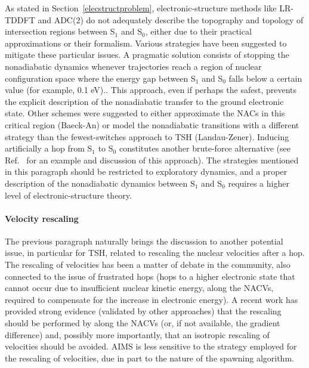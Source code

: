\documentclass[9pt,bestpractices]{livecoms}
\begin{document}
As stated in Section~\ref{elecstructproblem}, electronic-structure methods like LR-TDDFT and ADC(2) do not adequately describe the topography and topology of intersection regions between S$_1$ and S$_0$, either due to their practical approximations or their formalism. Various strategies have been suggested to mitigate these particular issues. A pragmatic solution consists of stopping the nonadiabatic dynamics whenever trajectories reach a region of nuclear configuration space where the energy gap between S$_1$ and S$_0$ falls below a certain value (for example, 0.1 eV).\cite{crespo-otero2011,plasser2014surface}. This approach, even if perhaps the safest, prevents the explicit description of the nonadiabatic transfer to the ground electronic state. Other schemes were suggested to either approximate the NACs in this critical region (Baeck-An\cite{baeck-an2017,do2022fewest}) or model the nonadiabatic transitions with a different strategy than the fewest-switches approach to TSH (Landau-Zener\cite{belyaev2011nonadiabatic,slavicek2020}). Inducing artificially a hop from S$_1$ to S$_0$ constitutes another brute-force alternative (see Ref.~ for an example and discussion of this approach). The strategies mentioned in this paragraph should be restricted to exploratory dynamics, and a proper description of the nonadiabatic dynamics between S$_1$ and S$_0$ requires a higher level of electronic-structure theory. 

\paragraph{Velocity rescaling}

The previous paragraph naturally brings the discussion to another potential issue, in particular for TSH, related to rescaling the nuclear velocities after a hop. The rescaling of velocities has been a matter of debate in the community, also connected to the issue of frustrated hops (hops to a higher electronic state that cannot occur due to insufficient nuclear kinetic energy, along the NACVs, required to compensate for the increase in electronic energy).\cite{fang99b,huang2023,subotnik2016understanding} A recent work has provided strong evidence (validated by other approaches\cite{Mannouch2023}) that the rescaling should be performed by along the NACVs (or, if not available, the gradient difference) and, possibly more importantly, that an isotropic rescaling of velocities should be avoided.\cite{toldo2024velresc} AIMS is less sensitive to the strategy employed for the rescaling of velocities, due in part to the nature of the spawning algorithm.\cite{ibele2020} 
\end{document}
